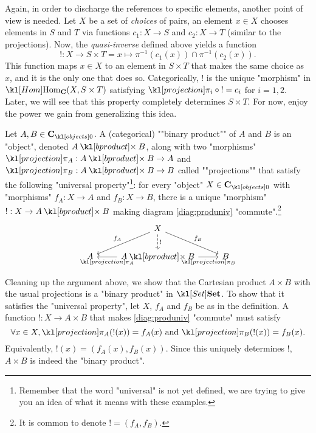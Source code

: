 \documentclass[main.tex]{subfiles}
\begin{document}
Again, in order to discharge the references to specific elements, another point of view is needed. Let $X$ be a set of \textit{choices} of pairs, an element $x \in X$ chooses elements in $S$ and $T$ via functions $c_1 : X \rightarrow S$ and $c_2: X \rightarrow T$ (similar to the projections). Now, the \textit{quasi-inverse} defined above yields a function
\[!:X \rightarrow S\times T = x \mapsto \pi^{-1}(c_1(x)) \cap \pi^{-1}(c_2(x)).\]
This function maps $x \in X$ to an element in $S\times T$ that makes the same choice as $x$, and it is the only one that does so. Categorically, $!$ is the unique "morphism" in $\Hom_{\mathbf{C}}(X, S\times T)$ satisfying $\projection_i\circ {!} = c_i$ for $i =1,2$. Later, we will see that this property completely determines $S\times T$. For now, enjoy the power we gain from generalizing this idea.
\begin{defn}\label{defn:binprod}
    \AP Let $A, B \in \obj{\mathbf{C}}$. A (categorical) ""binary product"" of $A$ and $B$ is an "object", denoted $A \product B$, along with two "morphisms" $\projection_A: A \product B \rightarrow A$ and $\projection_B: A \product B \rightarrow B$ called ""projections"" that satisfy the following "universal property"\footnote{Remember that the word "universal" is not yet defined, we are trying to give you an idea of what it means with these examples.}: for every "object" $X \in \obj{\mathbf{C}}$ with "morphisms" $f_A: X\rightarrow A$ and $f_B:X \rightarrow B$, there is a unique "morphism" $!: X \rightarrow A \product B$ making diagram \eqref{diag:produniv} "commute".\footnote{It is common to denote $! = (f_A, f_B)$.}
    \begin{equation}
    \begin{tikzcd}\label{diag:produniv}
        & X \arrow[ld, "f_A"'] \arrow[rd, "f_B"] \arrow[d, "!", dashed] &   \\
        A & A\product B \arrow[l, "\projection_A"] \arrow[r, "\projection_B"']              & B
    \end{tikzcd}
    \end{equation}
\end{defn}
\begin{exmp}[$\catSet$]
    Cleaning up the argument above, we show that the Cartesian product $A \times B$ with the usual projections is a "binary product" in $\catSet$. To show that it satisfies the "universal property", let $X$, $f_A$ and $f_B$ be as in the definition. A function $!:X\rightarrow A \times B$ that makes \eqref{diag:produniv} "commute" must satisfy
    \[\forall x\in X, \projection_A(!(x)) = f_A(x) \text{ and } \projection_B(!(x)) = f_B(x).\]
    Equivalently, $!(x) = (f_A(x), f_B(x))$. Since this uniquely determines $!$, $A \times B$ is indeed the "binary product".
\end{exmp}
\end{document}
